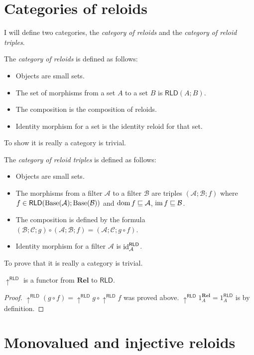 \section{Categories of reloids}

I will define two categories, the \emph{category of reloids} and the
\emph{category of reloid triples}.

The \emph{category of reloids} is defined
as follows:
\begin{itemize}
\item Objects are small sets.
\item The set of morphisms from a set $A$ to a set $B$ is $\mathsf{RLD}(A;B)$.
\item The composition is the composition of reloids.
\item Identity morphism for a set is the identity reloid for that set.
\end{itemize}
To show it is really a category is trivial.

The \emph{category of reloid triples}
is defined as follows:
\begin{itemize}
\item Objects are small sets.
\item The morphisms from a filter $\mathcal{A}$ to a filter $\mathcal{B}$
are triples $(\mathcal{A};\mathcal{B};f)$ where $f\in\mathsf{RLD}(\operatorname{Base}(\mathcal{A});\operatorname{Base}(\mathcal{B}))$
and $\operatorname{dom} f\sqsubseteq\mathcal{A}$, $\operatorname{im} f\sqsubseteq\mathcal{B}$.
\item The composition is defined by the formula $(\mathcal{B};\mathcal{C};g)\circ(\mathcal{A};\mathcal{B};f)=(\mathcal{A};\mathcal{C};g\circ f)$.
\item Identity morphism for a filter $\mathcal{A}$ is $\operatorname{id}_{\mathcal{A}}^{\mathsf{\mathsf{RLD}}}$.
\end{itemize}
To prove that it is really a category is trivial.
\begin{prop}
$\uparrow^{\mathsf{RLD}}$ is a functor from $\mathbf{Rel}$ to $\mathsf{RLD}$.\end{prop}
\begin{proof}
$\uparrow^{\mathsf{RLD}}(g\circ f)=\uparrow^{\mathsf{RLD}}g\circ\uparrow^{\mathsf{RLD}}f$
was proved above. $\uparrow^{\mathsf{RLD}}1_{A}^{\mathbf{Rel}}=1_{A}^{\mathsf{RLD}}$
is by definition.
\end{proof}

\section{Monovalued and injective reloids}

